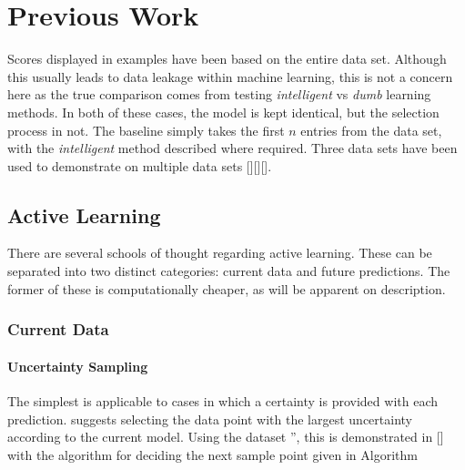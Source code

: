
\chapter{Previous Work}

\ifpdf
  \graphicspath{{Chapter2/Figs/Raster/}{Chapter2/Figs/PDF/}{Chapter2/Figs/}}
\else
  \graphicspath{{Chapter2/Figs/Vector/}{Chapter2/Figs/}}
\fi


Scores displayed in examples have been based on the entire data set. Although this usually leads to data leakage within machine learning, this is not a concern here as the true comparison comes from testing  \textit{intelligent} vs \textit{dumb} learning methods. In both of these cases, the model is kept identical, but the selection process in not. The baseline simply takes the first $n$ entries from the data set, with the \textit{intelligent} method described where required. Three data sets have been used to demonstrate on multiple data sets [][][].

\section{Active Learning}\label{ch:Active Learning}
There are several schools of thought regarding active learning. These can be separated into two distinct categories: current data and future predictions. The former of these is computationally cheaper, as will be apparent on description.

\subsection{Current Data}
\subsubsection{Uncertainty Sampling}\label{sec:Uncertainty Sampling}
The simplest is applicable to cases in which a certainty is provided with each prediction.  suggests selecting the data point with the largest uncertainty according to the current model. Using the dataset '', this is demonstrated in [] with the algorithm for deciding the next sample point given in Algorithm


